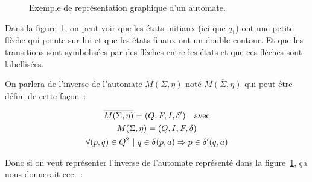 \begin{figure}[H]
    \centering
    \captionsetup{type=figure,justification=centering}
    \caption{
        Exemple de représentation graphique d'un automate.
    }\label{fig:automata}
\end{figure}

Dans la figure~\ref{fig:automata}, on peut voir que les états initiaux (ici que
\(q_1\)) ont une petite flèche qui pointe sur lui et que les états finaux ont
un double contour. Et que les transitions sont symbolisées par des flèches
entre les états et que ces flèches sont labellisées.

\vphantom{}

On parlera de l'inverse de l'automate \(M(\Sigma, \eta)\) noté
\(\overline{M(\Sigma, \eta)}\) qui peut être défini de cette façon~:

\begin{gather}
    \overline{M(\Sigma, \eta)} = (Q, F, I, \delta') \quad \text{avec} \\
    M(\Sigma, \eta) = (Q, I, F, \delta) \notag \\
    \forall (p, q) \in Q^2 ~|~ q \in \delta(p, a) \Rightarrow p \in \delta'(q, a) \notag
\end{gather}

Donc si on veut représenter l'inverse de l'automate représenté dans la
figure~\ref{fig:automata}, ça nous donnerait ceci~:

